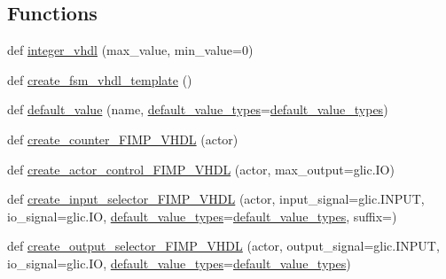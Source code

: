 \subsection*{Functions}
\begin{DoxyCompactItemize}
\item 
def \hyperlink{namespacesylva_1_1code__generation_1_1sylva__fimp__lib_acdc15946f5f6a217b6075944dbbd5f59}{integer\+\_\+vhdl} (max\+\_\+value, min\+\_\+value=0)
\item 
def \hyperlink{namespacesylva_1_1code__generation_1_1sylva__fimp__lib_a6deb8050547dff049bdfca46b07ba242}{create\+\_\+fsm\+\_\+vhdl\+\_\+template} ()
\item 
def \hyperlink{namespacesylva_1_1code__generation_1_1sylva__fimp__lib_a7ade6c6728b5e51bbbbfef039fc718cc}{default\+\_\+value} (name, \hyperlink{namespacesylva_1_1code__generation_1_1sylva__fimp__lib_aa8422a786f50398770d5f045867640e4}{default\+\_\+value\+\_\+types}=\hyperlink{namespacesylva_1_1code__generation_1_1sylva__fimp__lib_aa8422a786f50398770d5f045867640e4}{default\+\_\+value\+\_\+types})
\item 
def \hyperlink{namespacesylva_1_1code__generation_1_1sylva__fimp__lib_a88f096923aae1db8e521fcc0f7eda467}{create\+\_\+counter\+\_\+\+F\+I\+M\+P\+\_\+\+V\+H\+DL} (actor)
\item 
def \hyperlink{namespacesylva_1_1code__generation_1_1sylva__fimp__lib_a04ee93f22621c39841f015d731dad847}{create\+\_\+actor\+\_\+control\+\_\+\+F\+I\+M\+P\+\_\+\+V\+H\+DL} (actor, max\+\_\+output=glic.\+IO)
\item 
def \hyperlink{namespacesylva_1_1code__generation_1_1sylva__fimp__lib_ab22b6972c355f4ffbd4a498e417c9928}{create\+\_\+input\+\_\+selector\+\_\+\+F\+I\+M\+P\+\_\+\+V\+H\+DL} (actor, input\+\_\+signal=glic.\+I\+N\+P\+UT, io\+\_\+signal=glic.\+IO, \hyperlink{namespacesylva_1_1code__generation_1_1sylva__fimp__lib_aa8422a786f50398770d5f045867640e4}{default\+\_\+value\+\_\+types}=\hyperlink{namespacesylva_1_1code__generation_1_1sylva__fimp__lib_aa8422a786f50398770d5f045867640e4}{default\+\_\+value\+\_\+types}, suffix=\textquotesingle{}\textquotesingle{})
\item 
def \hyperlink{namespacesylva_1_1code__generation_1_1sylva__fimp__lib_ac6074b6b55425f68674b21fa5feef173}{create\+\_\+output\+\_\+selector\+\_\+\+F\+I\+M\+P\+\_\+\+V\+H\+DL} (actor, output\+\_\+signal=glic.\+I\+N\+P\+UT, io\+\_\+signal=glic.\+IO, \hyperlink{namespacesylva_1_1code__generation_1_1sylva__fimp__lib_aa8422a786f50398770d5f045867640e4}{default\+\_\+value\+\_\+types}=\hyperlink{namespacesylva_1_1code__generation_1_1sylva__fimp__lib_aa8422a786f50398770d5f045867640e4}{default\+\_\+value\+\_\+types})

\end{DoxyCompactItemize}
